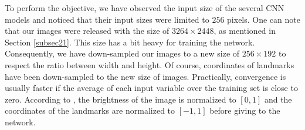 \documentclass[review]{elsarticle}
\begin{document}
To perform the objective, we have observed the input size of the several CNN models \cite{krizhevsky2012imagenet, ciregan2012multi, cintas2016automatic, sun2013deep} and noticed that their input sizes were limited to $256$ pixels. One can note that our images were released with the size of $3264 \times 2448$, as mentioned in Section \ref{subsec21}. This size has a bit heavy for training the network. Consequently, we have down-sampled our images to a new size of $256 \times 192$ to respect the ratio between width and height. Of course, coordinates of landmarks have been down-sampled to the new size of images. Practically, convergence is usually faster if the average of each input variable over the training set is close to zero. According to \cite{lecun2012efficient}, the brightness of the image is normalized to $[0,1]$ and the coordinates of the landmarks are normalized to $[-1,1]$ before giving to the network.
\end{document}
